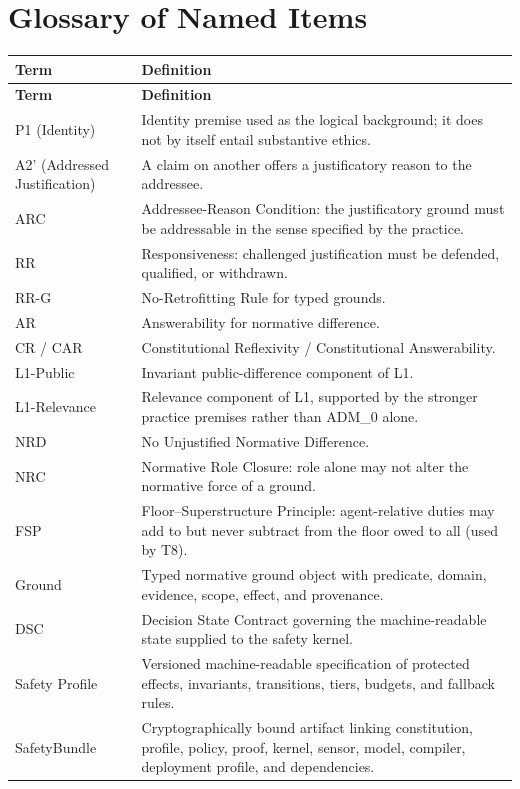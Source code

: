 \documentclass[11pt]{article}
\def\ensuremath#1{#1}%
\def\mathrm#1{#1}%
\def\mathsf#1{#1}%
\newcommand{\Atwo}{\texorpdfstring{\ensuremath{\mathrm{A2}'}}{A2'}}
\newcommand{\ADM}{\texorpdfstring{\ensuremath{\mathrm{ADM}_0}}{ADM0}}
\newcommand{\Ground}{\ensuremath{\mathsf{Ground}}}
\newcommand{\SafetyBundle}{\textsf{SafetyBundle}}
\begin{document}
\section{Glossary of Named Items}\label{sec:glossary}
\begin{longtable}{@{}L{3.2cm} L{11.8cm}@{}}
\toprule
\textbf{Term} & \textbf{Definition} \\
\midrule
\endfirsthead
\toprule
\textbf{Term} & \textbf{Definition} \\
\midrule
\endhead
\bottomrule
\endfoot
P1 (Identity) & Identity premise used as the logical background; it does not by itself entail substantive ethics. \\
\Atwo{} (Addressed Justification) & A claim on another offers a justificatory reason to the addressee. \\
ARC & Addressee-Reason Condition: the justificatory ground must be addressable in the sense specified by the practice. \\
RR & Responsiveness: challenged justification must be defended, qualified, or withdrawn. \\
RR-G & No-Retrofitting Rule for typed grounds. \\
AR & Answerability for normative difference. \\
CR / CAR & Constitutional Reflexivity / Constitutional Answerability. \\
L1-Public & Invariant public-difference component of L1. \\
L1-Relevance & Relevance component of L1, supported by the stronger practice premises rather than \ADM{} alone. \\
NRD & No Unjustified Normative Difference. \\
NRC & Normative Role Closure: role alone may not alter the normative force of a ground. \\
FSP & Floor--Superstructure Principle: agent-relative duties may add to but never subtract from the floor owed to all (used by T8). \\
\Ground{} & Typed normative ground object with predicate, domain, evidence, scope, effect, and provenance. \\
DSC & Decision State Contract governing the machine-readable state supplied to the safety kernel. \\
Safety Profile & Versioned machine-readable specification of protected effects, invariants, transitions, tiers, budgets, and fallback rules. \\
\SafetyBundle{} & Cryptographically bound artifact linking constitution, profile, policy, proof, kernel, sensor, model, compiler, deployment profile, and dependencies. \\

\end{longtable}
\end{document}
